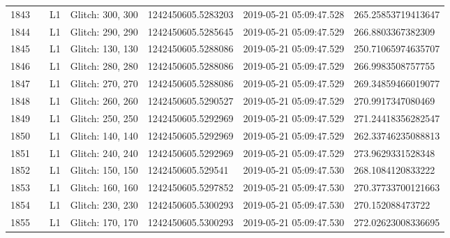 \begin{longtable}{lllllll}
1843 &                                                    &       L1 &  Glitch: 300, 300 &  1242450605.5283203 &  2019-05-21 05:09:47.528 &  265.25853719413647 \\
1844 &                                                    &       L1 &  Glitch: 290, 290 &  1242450605.5285645 &  2019-05-21 05:09:47.529 &   266.8803367382309 \\
1845 &                                                    &       L1 &  Glitch: 130, 130 &  1242450605.5288086 &  2019-05-21 05:09:47.529 &  250.71065974635707 \\
1846 &                                                    &       L1 &  Glitch: 280, 280 &  1242450605.5288086 &  2019-05-21 05:09:47.529 &   266.9983508757755 \\
1847 &                                                    &       L1 &  Glitch: 270, 270 &  1242450605.5288086 &  2019-05-21 05:09:47.529 &  269.34859466019077 \\
1848 &                                                    &       L1 &  Glitch: 260, 260 &  1242450605.5290527 &  2019-05-21 05:09:47.529 &   270.9917347080469 \\
1849 &                                                    &       L1 &  Glitch: 250, 250 &  1242450605.5292969 &  2019-05-21 05:09:47.529 &  271.24418356282547 \\
1850 &                                                    &       L1 &  Glitch: 140, 140 &  1242450605.5292969 &  2019-05-21 05:09:47.529 &  262.33746235088813 \\
1851 &                                                    &       L1 &  Glitch: 240, 240 &  1242450605.5292969 &  2019-05-21 05:09:47.529 &   273.9629331528348 \\
1852 &                                                    &       L1 &  Glitch: 150, 150 &   1242450605.529541 &  2019-05-21 05:09:47.530 &   268.1084120833222 \\
1853 &                                                    &       L1 &  Glitch: 160, 160 &  1242450605.5297852 &  2019-05-21 05:09:47.530 &  270.37733700121663 \\
1854 &                                                    &       L1 &  Glitch: 230, 230 &  1242450605.5300293 &  2019-05-21 05:09:47.530 &    270.152088473722 \\
1855 &                                                    &       L1 &  Glitch: 170, 170 &  1242450605.5300293 &  2019-05-21 05:09:47.530 &  272.02623008336695 \\

\end{longtable}
